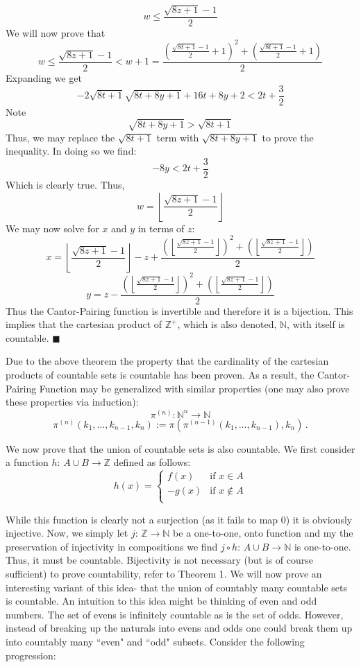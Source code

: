 \documentclass{article}
\begin{document}
\[
w \leq \frac{\sqrt{8z+1}-1}{2}
\]
We will now prove that 
\[
w \leq \frac{\sqrt{8z+1}-1}{2} < w+1=\frac{(\frac{\sqrt{8t+1}-1}{2}+1)^2+(\frac{\sqrt{8t+1}-1}{2}+1)}{2}
\]
Expanding we get
\[
-2\sqrt{8t+1}\sqrt{8t+8y+1}+16t+8y+2 < 2t+\frac{3}{2}
\]
Note
\[
\sqrt{8t+8y+1}>\sqrt{8t+1}
\]
Thus, we may replace the $\sqrt{8t+1}$ term with $\sqrt{8t+8y+1}$ to prove the inequality. In doing so we find:
\[
-8y<2t+\frac{3}{2}
\]
Which is clearly true. Thus,
\[
w=\left \lfloor{\frac{\sqrt{8z+1}-1}{2}}\right \rfloor
\]
We may now solve for $x$ and $y$ in terms of $z$:
\[
x=\left \lfloor{\frac{\sqrt{8z+1}-1}{2}}\right \rfloor - z + \frac{(\left \lfloor{\frac{\sqrt{8z+1}-1}{2}}\right \rfloor)^2+(\left \lfloor{\frac{\sqrt{8z+1}-1}{2}}\right \rfloor)}{2}
\]
\[
y=z - \frac{(\left \lfloor{\frac{\sqrt{8z+1}-1}{2}}\right \rfloor)^2+(\left \lfloor{\frac{\sqrt{8z+1}-1}{2}}\right \rfloor)}{2}
\]
Thus the Cantor-Pairing function is invertible and therefore it is a bijection. This implies that the cartesian product of $\mathbb{Z}^{+}$, which is also denoted, $\mathbb{N}$, with itself is countable.
{$\blacksquare$}
\par Due to the above theorem the property that the cardinality of the cartesian products of countable sets is countable has been proven. As a result, the Cantor-Pairing Function may be generalized with similar properties (one may also prove these properties via induction):
\[
\pi ^{{(n)}}:{\mathbb  {N}}^{n}\to {\mathbb  {N}}
\]
\[
\pi ^{{(n)}}(k_{1},\ldots ,k_{{n-1}},k_{n}):=\pi (\pi ^{{(n-1)}}(k_{1},\ldots ,k_{{n-1}}),k_{n})\,.
\]
\par We now prove that the union of countable sets is also countable. We first consider a function $h$: $A \cup B \to \mathbb{Z}$ defined as follows:
\[h(x) =
	\begin{cases} 
      f(x) & \text{if } x \in A \\
      -g(x) & \text{if } x \not\in A \\
   \end{cases}
\]
\par While this function is clearly not a surjection (as it fails to map 0) it is obviously injective. Now, we simply let $j$: $\mathbb{Z} \to \mathbb{N}$ be a one-to-one, onto function and my the preservation of injectivity in compositions we find $j \circ h$: $A \cup B \to \mathbb{N}$ is one-to-one. Thus, it must be countable. Bijectivity is not necessary (but is of course sufficient) to prove countability, refer to Theorem 1. We will now prove an interesting variant of this idea- that the union of countably many countable sets is countable. An intuition to this idea might be thinking of even and odd numbers. The set of evens is infinitely countable as is the set of odds. However, instead of breaking up the naturals into evens and odds one could break them up into countably many ``even" and ``odd" subsets. Consider the following progression:
\end{document}
